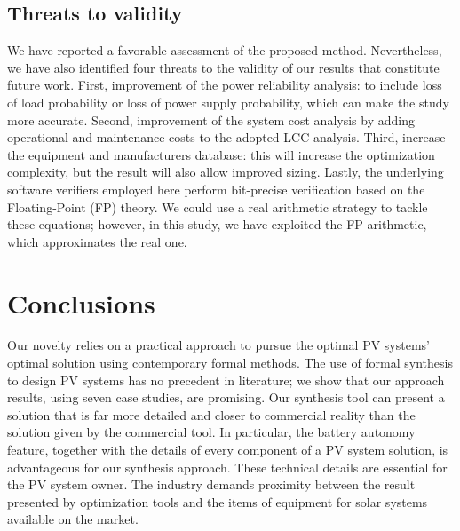 \documentclass[runningheads]{llncs}
\begin{document}
\subsection{Threats to validity} 

We have reported a favorable assessment of the proposed method. Nevertheless, we have also identified four threats to the validity of our results that constitute future work. First, improvement of the power reliability analysis: to include loss of load probability or loss of power supply probability, which can make the study more accurate. Second, improvement of the system cost analysis by adding operational and maintenance costs to the adopted LCC analysis. Third, increase the equipment and manufacturers database: this will increase the optimization complexity, but the result will also allow improved sizing. Lastly, the underlying software verifiers employed here perform bit-precise verification based on the Floating-Point (FP) theory. We could use a real arithmetic strategy to tackle these equations; however, in this study, we have exploited the FP arithmetic, which approximates the real one. 

\section{Conclusions} 

Our novelty relies on a practical approach to pursue the optimal PV systems' optimal solution using contemporary formal methods. The use of formal synthesis to design PV systems has no precedent in literature; we show that our approach results, using seven case studies, are promising. Our synthesis tool can present a solution that is far more detailed and closer to commercial reality than the solution given by the commercial tool. In particular, the battery autonomy feature, together with the details of every component of a PV system solution, is advantageous for our synthesis approach. These technical details are essential for the PV system owner. The industry demands proximity between the result presented by optimization tools and the items of equipment for solar systems available on the market. 
\end{document}
